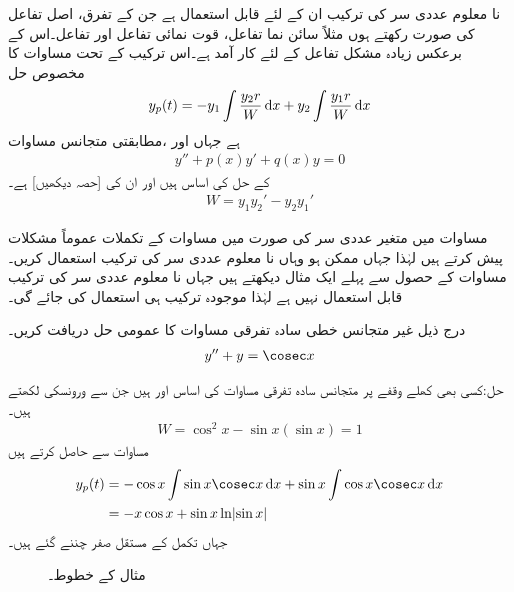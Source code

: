 نا معلوم عددی سر کی ترکیب ان  کے لئے قابل استعمال ہے جن کے تفرق، اصل تفاعل کی صورت رکھتے ہوں مثلاً سائن نما تفاعل، قوت نمائی  تفاعل اور  تفاعل۔اس کے برعکس  زیادہ مشکل تفاعل کے لئے کار آمد ہے۔اس ترکیب کے تحت مساوات  کا مخصوص حل
\begin{align}\label{مساوات_سادہ_دو_غیر_متجانس_خطی_ب}
y_p(t)=-y_1\int \frac{y_2 r}{W}\dif x+y_2\int \frac{y_1 r}{W}\dif x
\end{align}
ہے جہاں  اور  ،مطابقتی متجانس مساوات
\begin{align}\label{مساوات_سادہ_دو_غیر_متجانس_خطی_پ}
y''+p(x)y'+q(x)y=0
\end{align}
 کے حل کی اساس ہیں اور  ان کی  [حصہ  دیکھیں] ہے۔
\begin{align}\label{مساوات_سادہ_دو_غیر_متجانس_خطی_ت}
W=y_1y_2'-y_2y_1'
\end{align}

مساوات  میں متغیر عددی سر کی صورت میں مساوات  کے تکملات عموماً مشکلات  پیش کرتے ہیں لہٰذا جہاں ممکن ہو وہاں نا معلوم عددی سر کی ترکیب استعمال کریں۔مساوات  کے حصول سے پہلے ایک مثال دیکھتے ہیں جہاں نا معلوم عددی سر کی ترکیب قابل استعمال نہیں ہے لہٰذا موجودہ ترکیب ہی استعمال کی جائے گی۔

درج ذیل غیر متجانس خطی سادہ تفرقی مساوات کا عمومی حل دریافت کریں۔
\begin{align*}
y''+y=\cosec x
\end{align*}

حل:کسی بھی کھلے وقفے پر متجانس سادہ تفرقی مساوات کی اساس  اور  ہیں جن سے ورونسکی لکھتے ہیں۔
\begin{align*}
W=\cos^2 x-\sin x(\sin x)=1
\end{align*} 
مساوات  سے  حاصل کرتے ہیں
\begin{gather}
\begin{aligned}\label{مساوات_سادہ_دو_مثال_متعین_متغیرات_تبدیلی}
y_p(t)&=-\cos x\int \sin x \cosec x\dif x+\sin x\int \cos x \cosec x\dif x\\
&=-x\cos x+\sin x\ln\abs{\sin x}
\end{aligned}
\end{gather}
جہاں تکمل کے مستقل صفر چننے گئے ہیں۔
\begin{figure}
\centering
{}
\caption{مثال  کے خطوط۔}
\label{شکل_مثال_سادہ_دو_متعین_متغیرات_تبدیلی}
\end{figure}

